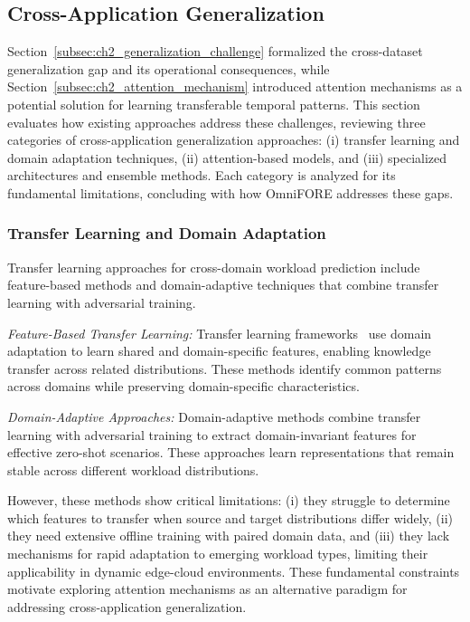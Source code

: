 \subsection{Cross-Application Generalization}  
\label{sec:ch2_sota_omni}

Section~\ref{subsec:ch2_generalization_challenge} formalized the cross-dataset generalization gap and its operational consequences, while Section~\ref{subsec:ch2_attention_mechanism} introduced attention mechanisms as a potential solution for learning transferable temporal patterns. This section evaluates how existing approaches address these challenges, reviewing three categories of cross-application generalization approaches: (i) transfer learning and domain adaptation techniques, (ii) attention-based models, and (iii) specialized architectures and ensemble methods. Each category is analyzed for its fundamental limitations, concluding with how \ac{OmniFORE} addresses these gaps.

\subsubsection{Transfer Learning and Domain Adaptation}

Transfer learning approaches for cross-domain workload prediction include feature-based methods and domain-adaptive techniques that combine transfer learning with adversarial training.

\textit{Feature-Based Transfer Learning:} Transfer learning frameworks~\cite{wang2019transfer} use domain adaptation to learn shared and domain-specific features, enabling knowledge transfer across related distributions. These methods identify common patterns across domains while preserving domain-specific characteristics.

\textit{Domain-Adaptive Approaches:} Domain-adaptive methods combine transfer learning with adversarial training to extract domain-invariant features for effective zero-shot scenarios. These approaches learn representations that remain stable across different workload distributions.

However, these methods show critical limitations: (i) they struggle to determine which features to transfer when source and target distributions differ widely, (ii) they need extensive offline training with paired domain data, and (iii) they lack mechanisms for rapid adaptation to emerging workload types, limiting their applicability in dynamic edge-cloud environments. These fundamental constraints motivate exploring attention mechanisms as an alternative paradigm for addressing cross-application generalization.

